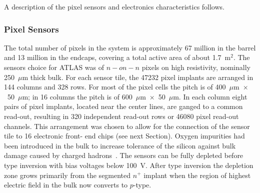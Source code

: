 A description of the pixel sensors and electronics characteristics follows.

\subsubsection{Pixel Sensors}
\label{sec:pixelsensors}

The total number of pixels in the system is approximately 67 million in the barrel and 13 million in the endcaps, covering a total active area of about 1.7~m$^2$.
The  sensors  choice for ATLAS was of $n-on-n$ pixels on high resistivity, nominally 250~$\mu$m 
thick bulk. For each sensor tile, the 47232 pixel implants are arranged in 144 columns and 328 rows. 
For most of the pixel cells the pitch is of 	400~$\mu$m~$\times$~50~$\mu$m; in 16 columns 
the pitch is of 600~$\mu$m~$\times$~50~$\mu$m. In each column eight pairs of pixel implants, located 
near the center lines, are ganged to a common read-out, resulting in 320 independent read-out rows or 
46080 pixel read-out channels. This arrangement was chosen to allow for the connection of the sensor 
tile to 16 electronic front- end chips (see next Section). 
Oxygen impurities had been introduced in the bulk to increase tolerance of the silicon against bulk damage caused by charged hadrons~\cite{Lindstrom:421210,LINDSTROM200160}.
The sensors can be fully depleted before type inversion with bias voltages below 100~V. After type 
inversion the depletion zone grows primarily from the segmented $n^+$ implant when the region of 
highest electric field in the bulk now converts to $p$-type.

